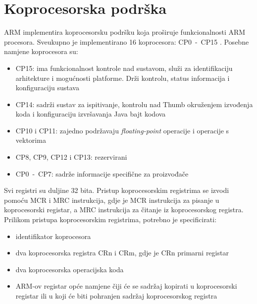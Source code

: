 \documentclass[times, utf8, diplomski, numeric]{fer}
\begin{document}
\section{Koprocesorska podrška}
ARM implementira koprocesorsku podršku koja proširuje funkcionalnosti ARM procesora. Sveukupno je implementirano 16 koprocesora:
CP0~-~CP15 \cite{arch_man}. Posebne namjene koprocesora su:
\begin{itemize}
  \item{CP15: ima funkcionalnost kontrole nad sustavom, služi za identifikaciju arhitekture i mogućnosti platforme. Drži
  kontrolu, status informacija i konfiguraciju sustava}
  \item{CP14: sadrži sustav za ispitivanje, kontrolu nad Thumb okruženjem izvođenja koda i konfiguraciju izvršavanja Java
  bajt kodova}
  \item{CP10 i CP11: zajedno podržavaju \textit{floating-point} operacije i operacije s vektorima}
  \item{CP8, CP9, CP12 i CP13: rezervirani}
  \item{CP0~-~CP7: sadrže informacije specifične za proizvođače}
\end{itemize}
Svi registri su duljine 32 bita. Pristup koprocesorskim registrima se izvodi pomoću MCR i MRC instrukcija, gdje je MCR
instrukcija za pisanje u koprocesorski registar, a MRC instrukcija za čitanje iz koprocesorskog registra.
Prilikom pristupa koprocesorskim registrima, potrebno je specificirati:
\begin{itemize}
  \item{identifikator koprocesora}
  \item{dva koprocesorska registra CRn i CRm, gdje je CRn primarni registar}
  \item{dva koprocesorska operacijska koda}
  \item{ARM-ov registar opće namjene čiji će se sadržaj kopirati u koprocesorski registar ili u koji će biti pohranjen
  sadržaj koprocesorskog registra}
\end{itemize}
\end{document}
